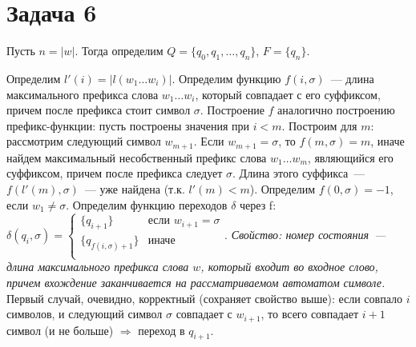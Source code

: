 \documentclass[a4paper]{article}
\begin{document}
\section*{Задача 6}
Пусть $n=|w|$. Тогда определим $Q=\{q_0,q_1,\dots,q_n\}$, $F=\{q_n\}$.
\begin{center}
\end{center}
Определим $l'(i)=|l(w_1\dots w_i)|$.\newline
Определим функцию $f(i,\sigma)$~--- длина максимального префикса слова $w_1\dots w_i$, который совпадает с его суффиксом, причем после префикса стоит символ $\sigma$. Построение $f$ аналогично построению префикс-функции: пусть построены значения при $i<m$. Построим для $m$: рассмотрим следующий символ $w_{m+1}$. Если $w_{m+1}=\sigma$, то $f(m,\sigma)=m$, иначе найдем максимальный несобственный префикс слова $w_1\dots w_{m}$, являющийся его суффиксом, причем после префикса следует $\sigma$. Длина этого суффикса~--- $f(l'(m),\sigma)$~--- уже найдена (т.к. $l'(m)<m$). Определим $f(0,\sigma)=-1$, если $w_1\neq \sigma$.\newline
Определим функцию переходов $\delta$ через f: $\delta(q_i,\sigma)=
\begin{cases}
\{q_{i+1}\} & \mbox{если } w_{i+1}=\sigma \\
\{q_{f(i,\sigma)+1}\} & \mbox{иначе} \\
\end{cases}$.\newline
{\em Свойство: номер состояния~--- длина максимального префикса слова $w$, который входит во входное слово, причем вхождение заканчивается на рассматриваемом автоматом символе.}\newline
Первый случай, очевидно, корректный (сохраняет свойство выше): если совпало $i$ символов, и следующий символ $\sigma$ совпадает с $w_{i+1}$, то всего совпадает $i+1$ символ (и не больше) $\Rightarrow$ переход в $q_{i+1}$.\newline
\end{document}
